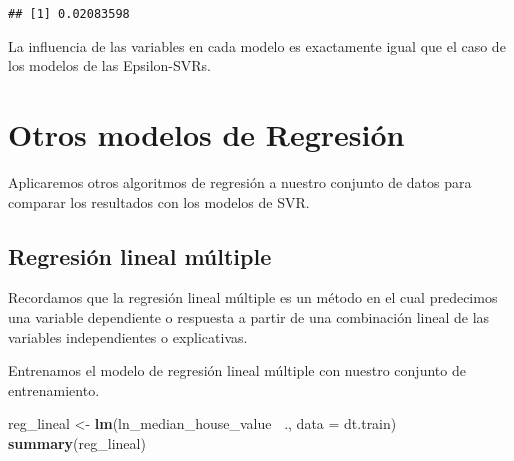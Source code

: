 \documentclass[
]{article}
\newenvironment{Shaded}{\begin{snugshade}}{\end{snugshade}}
\newcommand{\DataTypeTok}[1]{\textcolor[rgb]{0.13,0.29,0.53}{#1}}
\newcommand{\DecValTok}[1]{\textcolor[rgb]{0.00,0.00,0.81}{#1}}
\newcommand{\KeywordTok}[1]{\textcolor[rgb]{0.13,0.29,0.53}{\textbf{#1}}}
\newcommand{\NormalTok}[1]{#1}
\newcommand{\OperatorTok}[1]{\textcolor[rgb]{0.81,0.36,0.00}{\textbf{#1}}}
\newcommand{\StringTok}[1]{\textcolor[rgb]{0.31,0.60,0.02}{#1}}
\begin{document}
\begin{Shaded}
\end{Shaded}

\begin{verbatim}
## [1] 0.02083598
\end{verbatim}

La influencia de las variables en cada modelo es exactamente igual que
el caso de los modelos de las Epsilon-SVRs.

\hypertarget{otros-modelos-de-regresiuxf3n}{%
\section{Otros modelos de
Regresión}\label{otros-modelos-de-regresiuxf3n}}

Aplicaremos otros algoritmos de regresión a nuestro conjunto de datos
para comparar los resultados con los modelos de SVR.

\hypertarget{regresiuxf3n-lineal-muxfaltiple}{%
\subsection{Regresión lineal
múltiple}\label{regresiuxf3n-lineal-muxfaltiple}}

Recordamos que la regresión lineal múltiple es un método en el cual
predecimos una variable dependiente o respuesta a partir de una
combinación lineal de las variables independientes o explicativas.

Entrenamos el modelo de regresión lineal múltiple con nuestro conjunto
de entrenamiento.

\begin{Shaded}
\begin{Highlighting}[]
\NormalTok{reg_lineal <-}\StringTok{ }\KeywordTok{lm}\NormalTok{(ln_median_house_value }\OperatorTok{~}\NormalTok{.,}
               \DataTypeTok{data =}\NormalTok{ dt.train)}
\KeywordTok{summary}\NormalTok{(reg_lineal)}
\end{Highlighting}
\end{Shaded}
\end{document}
